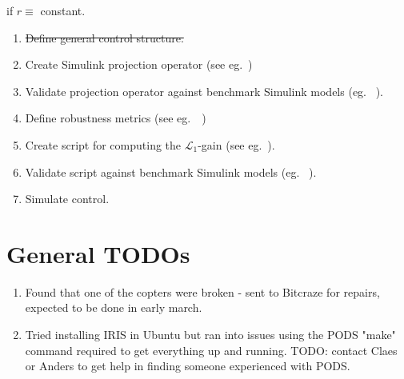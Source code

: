 \documentclass{article}
\begin{document}
if $r \equiv$ constant.
\begin{enumerate}
\subsubsection*{TODO}
\item \sout{Define general control structure.}
\item Create Simulink projection operator (see eg.~\cite{L1control})
\item Validate projection operator against benchmark Simulink models (eg. ~\cite{cao2006design}).
\item Define robustness metrics (see eg.~\cite{L1control}~\cite{huynh20141})
\item Create script for computing the $\mathcal{L}_1$-gain (see eg.~\cite{L1control}).
\item Validate script against benchmark Simulink models (eg. ~\cite{cao2006design}).
\item Simulate control.
\end{enumerate}

\section{General TODOs}
\begin{enumerate}
\item Found that one of the copters were broken - sent to Bitcraze for repairs, expected to be done in early march.
\item Tried installing IRIS in Ubuntu but ran into issues using the PODS "make" command required to get everything up and running. TODO: contact Claes or Anders to get help in finding someone experienced with PODS.
\end{enumerate}

\newpage{}

\end{document}
